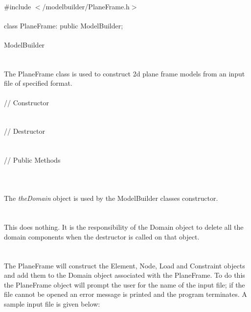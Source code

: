 
   \\
\indent \#include $<$/modelbuilder/PlaneFrame.h$>$  \\

  \\
\indent class PlaneFrame: public ModelBuilder;  \\

 \\
\indent ModelBuilder \\
\indent{} \\

 \\ 
\indent The PlaneFrame class is used to construct 2d plane frame
models from an input file of specified format. \\

 \\ 
\indent // Constructor \\ 
\\ \\
\indent // Destructor \\
\\ \\
\indent // Public Methods \\
 \\


 \\ 
\\ 
The {\em theDomain} object is used by the ModelBuilder classes 
constructor. \\ 

 \\
\\ 
This does nothing. It is the responsibility of the Domain object to delete
all the domain components when the destructor is called on that object. \\

 \\
 \\
The PlaneFrame will construct the Element, Node, Load and Constraint
objects and add them to the Domain object associated with the PlaneFrame. 
To do this the PlaneFrame object will prompt the user for the name of 
the input file; if the file cannot be opened an error message is
printed and the program terminates. A sample input file is given below: \\

